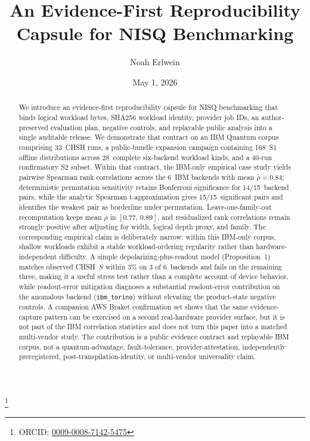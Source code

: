 \documentclass[aps,prxquantum,twocolumn,superscriptaddress,amsmath,amssymb,longbibliography,floatfix]{revtex4-2}
\begin{document}
\title{An Evidence-First Reproducibility Capsule for NISQ Benchmarking}

\author{Noah Erlwein}
\thanks{ORCID: \href{https://orcid.org/0009-0008-7142-5475}{0009-0008-7142-5475}}

\date{May 1, 2026}

\begin{abstract}
We introduce an evidence-first reproducibility capsule for NISQ benchmarking that binds logical workload bytes, SHA256 workload identity, provider job IDs, an author-preserved evaluation plan, negative controls, and replayable public analysis into a single auditable release. We demonstrate that contract on an IBM Quantum corpus comprising 33~CHSH runs, a public-bundle expansion campaign containing 168~S1 offline distributions across 28~complete six-backend workload kinds, and a 40-run confirmatory S2 subset. Within that contract, the IBM-only empirical case study yields pairwise Spearman rank correlations across the 6~IBM backends with mean $\bar{\rho} = 0.84$; deterministic permutation sensitivity retains Bonferroni significance for 14/15~backend pairs, while the analytic Spearman t-approximation gives 15/15~significant pairs and identifies the weakest pair as borderline under permutation. Leave-one-family-out recomputation keeps mean $\bar{\rho}$ in $[0.77,\,0.89]$, and residualized rank correlations remain strongly positive after adjusting for width, logical depth proxy, and family. The corresponding empirical claim is deliberately narrow: within this IBM-only corpus, shallow workloads exhibit a stable workload-ordering regularity rather than hardware-independent difficulty. A simple depolarizing-plus-readout model (Proposition~1) matches observed CHSH~$S$ within 3\% on 3 of 6~backends and fails on the remaining three, making it a useful stress test rather than a complete account of device behavior, while readout-error mitigation diagnoses a substantial readout-error contribution on the anomalous backend (\texttt{ibm\_torino}) without elevating the product-state negative controls. A companion AWS Braket confirmation set shows that the same evidence-capture pattern can be exercised on a second real-hardware provider surface, but it is not part of the IBM correlation statistics and does not turn this paper into a matched multi-vendor study. The contribution is a public evidence contract and replayable IBM corpus, not a quantum-advantage, fault-tolerance, provider-attestation, independently preregistered, post-transpilation-identity, or multi-vendor universality claim.
\end{abstract}
\end{document}
